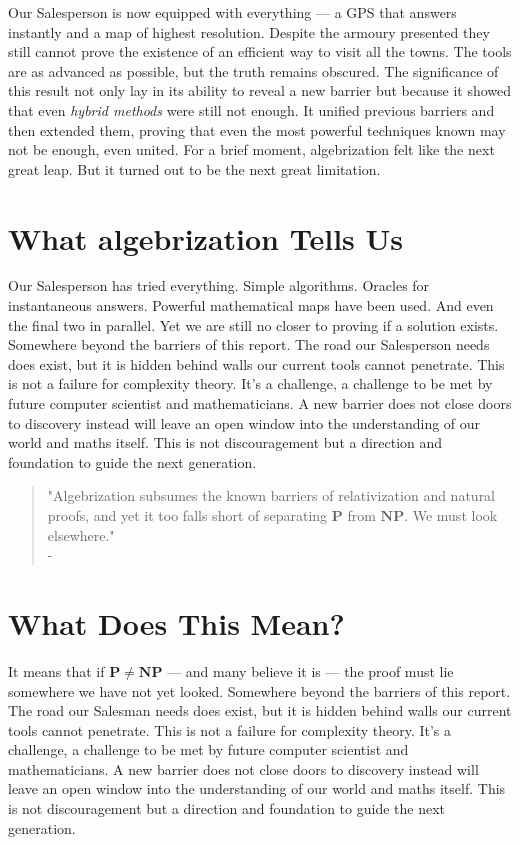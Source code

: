 \documentclass[12pt]{report}
\begin{document}
Our Salesperson is now equipped with everything --- a GPS that answers instantly and a map of highest resolution.
Despite the armoury presented they still cannot prove the existence of an efficient way to visit all the towns.
The tools are as advanced as possible, but the truth remains obscured.
The significance of this result not only lay in its ability to reveal a new barrier but because it showed that even \textit{hybrid methods} were still not enough.
It unified previous barriers and then extended them, proving that even the most powerful techniques known may not be enough, even united.
For a brief moment, algebrization felt like the next great leap.
But it turned out to be the next great limitation.

\section{What algebrization Tells Us}
Our Salesperson has tried everything.
Simple algorithms.
Oracles for instantaneous answers.
Powerful mathematical maps have been used.
And even the final two in parallel.
Yet we are still no closer to proving if a solution exists.
Somewhere beyond the barriers of this report.
The road our Salesperson needs does exist, but it is hidden behind walls our current tools cannot penetrate.
This is not a failure for complexity theory.
It's a challenge, a challenge to be met by future computer scientist and mathematicians.
A new barrier does not close doors to discovery instead will leave an open window into the understanding of our world and maths itself.
This is not discouragement but a direction and foundation to guide the next generation.
\begin{quote}
    "Algebrization subsumes the known barriers of relativization and natural proofs, and yet it too falls short of separating $\mathbf{P}$ from $\mathbf{NP}$. We must look elsewhere."\\
    -\cite{arora2008algebrization}
\end{quote}

\section{What Does This Mean?}
It means that if $\mathbf{P \ne NP}$ --- and many believe it is --- the proof must lie somewhere we have not yet looked.
Somewhere beyond the barriers of this report.
The road our Salesman needs does exist, but it is hidden behind walls our current tools cannot penetrate.
This is not a failure for complexity theory.
It's a challenge, a challenge to be met by future computer scientist and mathematicians.
A new barrier does not close doors to discovery instead will leave an open window into the understanding of our world and maths itself.
This is not discouragement but a direction and foundation to guide the next generation.
\end{document}

